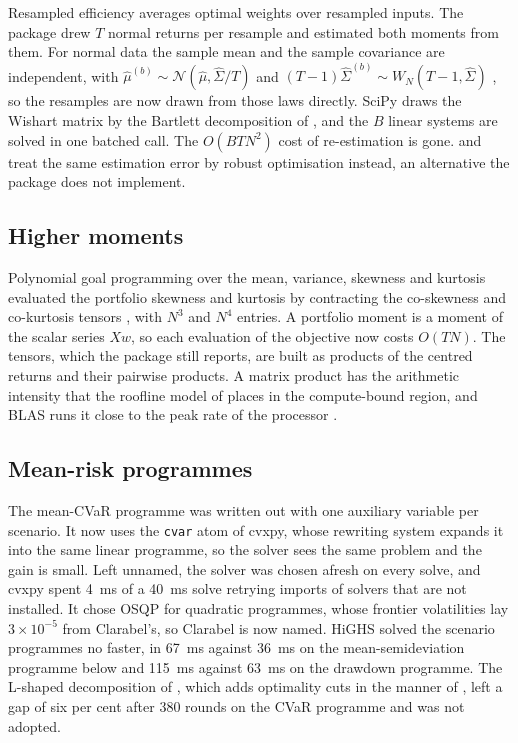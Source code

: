 Resampled efficiency \citep{michaud_markowitz_1989} averages optimal weights
over resampled inputs. The package drew $T$ normal returns per resample and
estimated both moments from them. For normal data the sample mean and the
sample covariance are independent, with
$\hat{\mu}^{(b)} \sim \mathcal{N}(\hat{\mu}, \hat{\Sigma} / T)$ and
$(T - 1) \hat{\Sigma}^{(b)} \sim W_N(T - 1, \hat{\Sigma})$
\citep{wishart_generalised_1928}, so the resamples are now drawn from those
laws directly. SciPy draws the Wishart matrix by the Bartlett decomposition
of \citet{smith_algorithm_1972}, and the $B$ linear systems are solved in one
batched call. The $O(B T N^{2})$ cost of re-estimation is gone.
\citet{goldfarb_robust_2003} and \citet{tutuncu_robust_2004} treat the same
estimation error by robust optimisation instead, an alternative the package
does not implement.

\subsection{Higher moments}

Polynomial goal programming over the mean, variance, skewness and kurtosis
\citep{lai_portfolio_1991,jondeau_optimal_2006,harvey_portfolio_2010}
evaluated the portfolio skewness and kurtosis by contracting the co-skewness
and co-kurtosis tensors \citep{boudt_higher_2015}, with $N^{3}$ and $N^{4}$
entries. A portfolio moment is a moment of the scalar series $X w$, so each
evaluation of the objective now costs $O(T N)$. The tensors, which the
package still reports, are built as products of the centred returns and
their pairwise products. A matrix product has the arithmetic intensity that
the roofline model of \citet{williams_roofline_2009} places in the
compute-bound region, and BLAS runs it close to the peak rate of the
processor \citep{goto_anatomy_2008}.

\subsection{Mean-risk programmes}

The mean-CVaR programme
\citep{rockafellar_optimization_2000,rockafellar_conditional_2002}
was written out with one auxiliary variable per scenario. It now uses the
\texttt{cvar} atom of cvxpy, whose rewriting system
\citep{agrawal_rewriting_2018} expands it into the same linear programme, so
the solver sees the same problem and the gain is small. Left unnamed, the
solver was chosen afresh on every solve, and cvxpy spent 4~ms of a 40~ms
solve retrying imports of solvers that are not installed. It chose OSQP for
quadratic programmes, whose frontier volatilities lay $3 \times 10^{-5}$ from
Clarabel's, so Clarabel is now named. HiGHS solved the scenario programmes no
faster, in 67~ms against 36~ms on the mean-semideviation programme below and
115~ms against 63~ms on the drawdown programme. The L-shaped decomposition of
\citet{kunzibay_computational_2006}, which adds optimality cuts in the manner
of \citet{kelley_cuttingplane_1960}, left a gap of six per cent after 380
rounds on the CVaR programme and was not adopted.

